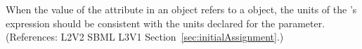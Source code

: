 When the value of the attribute  in an \InitialAssignment
object refers to a \Parameter object, the units of the \InitialAssignment's
 expression should be consistent with the units declared for
the parameter.  (References: L2V2 SBML L3V1
Section~\ref{sec:initialAssignment}.)
